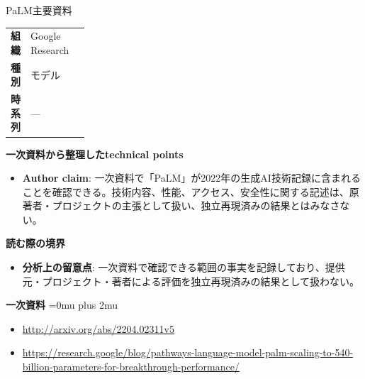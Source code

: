 \begin{technicalnote}{PaLM}{主要資料}
\begingroup
\begin{tabularx}{\linewidth}{@{}>{\bfseries}p{0.22\linewidth}X@{}}
組織 & Google Research \\
種別 & モデル \\
時系列 & — \\
\end{tabularx}
\smallskip
{\bfseries 一次資料から整理したtechnical points}
\begin{itemize}[leftmargin=1.5em,itemsep=0.35em]
\item \textbf{Author claim}: 一次資料で「PaLM」が2022年の生成AI技術記録に含まれることを確認できる。技術内容、性能、アクセス、安全性に関する記述は、原著者・プロジェクトの主張として扱い、独立再現済みの結果とはみなさない。
\end{itemize}
\begin{minipage}{\linewidth}
{\bfseries 読む際の境界}
\begin{itemize}[leftmargin=1.5em,itemsep=0.35em]
\item \textbf{分析上の留意点}: 一次資料で確認できる範囲の事実を記録しており、提供元・プロジェクト・著者による評価を独立再現済みの結果として扱わない。
\end{itemize}
\begin{samepage}
{\bfseries 一次資料}
\begingroup\sloppy
\Urlmuskip=0mu plus 2mu\relax
\begin{itemize}[leftmargin=1.5em,itemsep=0.25em]
\item {\scriptsize\url{http://arxiv.org/abs/2204.02311v5}}
\item {\scriptsize\url{https://research.google/blog/pathways-language-model-palm-scaling-to-540-billion-parameters-for-breakthrough-performance/}}
\end{itemize}
\endgroup
\end{samepage}
\end{minipage}
\endgroup
\end{technicalnote}
\medskip

